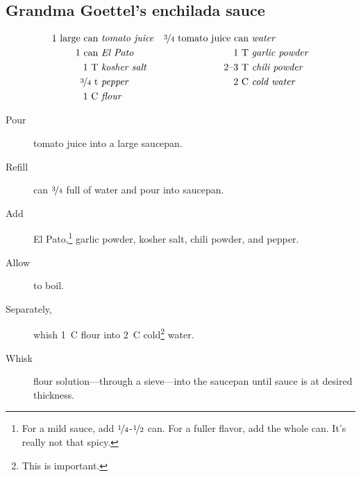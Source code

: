 \subsection{Grandma Goettel's enchilada sauce}

\begin{align*}
    \text{1~large~can} &~\text{\emph{tomato juice}} & \text{\nicefrac{3}{4}~tomato~juice~can} &~\text{\emph{water}} \\
    \text{1~can} &~\text{\emph{El Pato}}            & \text{1~T} &~\text{\emph{garlic powder}}                      \\
    \text{1~T} &~\text{\emph{kosher salt}}          & \text{2--3~T} &~\text{\emph{chili powder}}                    \\
    \text{\nicefrac{3}{4}~t} &~\text{\emph{pepper}} & \text{2~C} &~\text{\emph{cold water}}                         \\
    \text{1~C} &~\text{\emph{flour}}
\end{align*}

\begin{description}
    \item[Pour]tomato juice into a large saucepan.
    \item[Refill]can $\nicefrac{3}{4}$ full of water and pour into saucepan.
    \item[Add]El Pato,\footnote{For a mild sauce, add $\nicefrac{1}{4}$-$\nicefrac{1}{2}$ can. For a fuller flavor, add the whole can. It's really not that spicy.} garlic powder, kosher salt, chili powder, and pepper.
    \item[Allow]to boil.
    \item[Separately,]whish 1~C flour into 2~C cold\footnote{This is important.} water.
    \item[Whisk]flour solution---through a sieve---into the saucepan until sauce is at desired thickness.
\end{description}

\pagebreak
